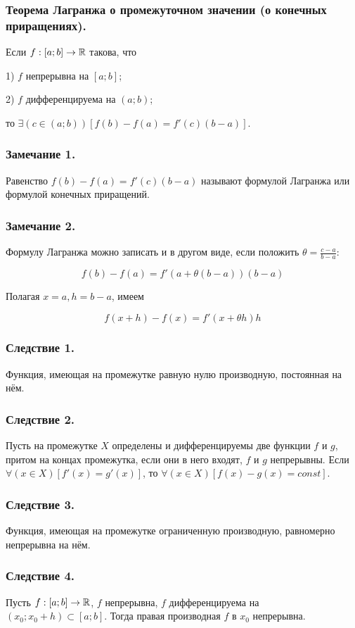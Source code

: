 \subsubsection{Теорема Лагранжа о промежуточном значении (о конечных приращениях).}

Если $f:[a;b]\to \mathbb{R}$ такова, что

1) $f$ непрерывна на $[a;b]$;

2) $f$ дифференцируема на $(a;b)$;

то $\exists(c \in (a;b))[f(b)-f(a)=f'(c)(b-a)]$.

\subsubsection{Замечание 1.}

Равенство $f(b)-f(a)=f'(c)(b-a)$ называют формулой Лагранжа или формулой конечных приращений.

\subsubsection{Замечание 2.}

Формулу Лагранжа можно записать и в другом виде, если положить $\theta=\frac{c-a}{b-a}$:

$$
f(b)-f(a)=f'(a+\theta(b-a))(b-a)
$$

Полагая $x=a, h=b-a$, имеем

$$
f(x+h)-f(x)=f'(x+\theta h)h
$$

\subsubsection{Следствие 1.}

Функция, имеющая на промежутке равную нулю производную, постоянная на нём.

\subsubsection{Следствие 2.}

Пусть на промежутке $X$ определены и дифференцируемы две функции $f$ и $g$, притом на концах промежутка, если они в него входят, $f$ и $g$ непрерывны.
Если $\forall(x \in X)[f'(x)=g'(x)]$, то $\forall(x \in X)[f(x)-g(x)=const]$.

\subsubsection{Следствие 3.}

Функция, имеющая на промежутке ограниченную производную, равномерно непрерывна на нём.

\subsubsection{Следствие 4.}

Пусть $f:[a;b]\to \mathbb{R}$, $f$ непрерывна, $f$ дифференцируема на $(x_0;x_0+h)\subset [a;b]$.
Тогда правая производная $f$ в $x_0$ непрерывна.


